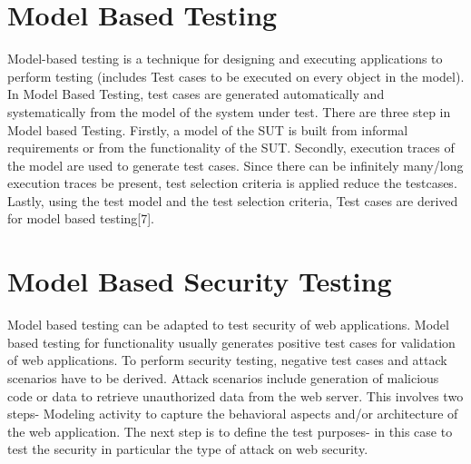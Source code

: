 \section{Model Based Testing}
Model-based testing is a technique for designing and executing applications to perform testing (includes Test cases to be executed on every object in the model). In Model Based Testing, test cases are generated automatically and systematically from the model of the system under test. There are three step in Model based Testing. Firstly, a model of the SUT is built from informal requirements or from the functionality of the SUT. Secondly, execution traces of the model are used to generate test cases. Since there can be infinitely many/long execution traces be present, test selection criteria is applied reduce the testcases. Lastly, using the test model and the test selection criteria, Test cases are derived for model based testing[7]. 

\section{Model Based Security Testing}

Model based testing can be adapted to test security of web applications. Model based testing for functionality usually generates positive test cases for validation of web applications. To perform security testing, negative test cases and attack scenarios have to be derived. Attack scenarios include generation of malicious code or data to retrieve unauthorized data from the web server. This involves two steps- Modeling activity to capture the behavioral aspects and/or architecture of the web application. The next step is to define the test purposes- in this case to test the security in particular the type of attack on web security.   
 